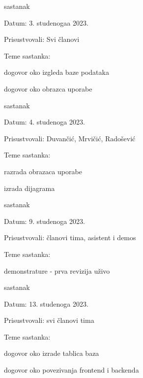 \begin{packed_enum}
			\item  sastanak
			\item[] \begin{packed_item}
				\item Datum: 3. studenogaa 2023.
				\item Prisustvovali: Svi članovi
				\item Teme sastanka:
				\begin{packed_item}
					\item  dogovor oko izgleda baze podataka
					\item dogovor oko obrazca uporabe
				\end{packed_item}
			\end{packed_item}
			
			\item  sastanak
			\item[] \begin{packed_item}
				\item Datum: 4. studenoga 2023.
				\item Prisustvovali: Duvančić, Mrvičić, Radošević
				\item Teme sastanka:
				\begin{packed_item}
					\item  razrada obrazaca uporabe
					\item  izrada dijagrama
				\end{packed_item}
			\end{packed_item}
			
			\item  sastanak
			\item[] \begin{packed_item}
				\item Datum: 9. studenoga 2023.
				\item Prisustvovali: članovi tima, asistent i demos
				\item Teme sastanka:
				\begin{packed_item}
					\item  demonstrature - prva revizija uživo
				\end{packed_item}
			\end{packed_item}
			
			\item  sastanak
			\item[] \begin{packed_item}
				\item Datum: 13. studenoga 2023.
				\item Prisustvovali: svi članovi tima
				\item Teme sastanka:
				\begin{packed_item}
					\item  dogovor oko izrade tablica baza
					\item  dogovor oko povezivanja frontend i backenda
				\end{packed_item}
			\end{packed_item}
			

\end{packed_enum}
